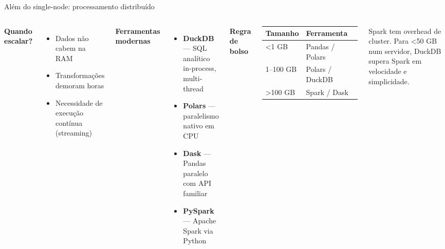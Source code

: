 \documentclass[xcolor=dvipsnames,t,aspectratio=169]{beamer}
\newcommand{\highlight}[1]{{\color{nes_dark_orange} #1}}
\begin{document}
\begin{frame}[c]{Além do single-node: processamento distribuído}

\begin{columns}
\textbf{\color{nes_dark_purple}Quando escalar?}
\begin{itemize}
    \item Dados \highlight{não cabem na RAM}
    \item Transformações demoram horas
    \item Necessidade de execução contínua (streaming)
\end{itemize}

\vspace{0.5em}
\textbf{\color{nes_dark_purple}Ferramentas modernas}
\begin{itemize}
    \item \textbf{DuckDB} — SQL analítico in-process, multi-thread
    \item \textbf{Polars} — paralelismo nativo em CPU
    \item \textbf{Dask} — Pandas paralelo com API familiar
    \item \textbf{PySpark} — Apache Spark via Python
\end{itemize}

\textbf{\color{nes_dark_purple}Regra de bolso}

\vspace{0.4em}
\begin{tabular}{ll}
\textbf{Tamanho}   & \textbf{Ferramenta} \\
\hline
\textless 1 GB     & Pandas / Polars     \\
1--100 GB          & Polars / DuckDB     \\
\textgreater 100 GB & Spark / Dask        \\
\end{tabular}

\vspace{0.8em}
\begin{display}[Avisos]
Spark tem overhead de cluster. Para \textless 50 GB num servidor, DuckDB supera Spark em velocidade e simplicidade.
\end{display}
\end{columns}

\end{frame}
\end{document}
